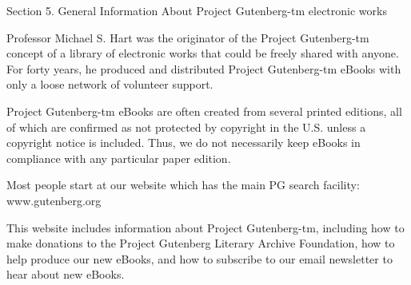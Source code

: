 Section 5. General Information About Project Gutenberg-tm electronic works

Professor Michael S. Hart was the originator of the Project
Gutenberg-tm concept of a library of electronic works that could be
freely shared with anyone. For forty years, he produced and
distributed Project Gutenberg-tm eBooks with only a loose network of
volunteer support.

Project Gutenberg-tm eBooks are often created from several printed
editions, all of which are confirmed as not protected by copyright in
the U.S. unless a copyright notice is included. Thus, we do not
necessarily keep eBooks in compliance with any particular paper
edition.

Most people start at our website which has the main PG search
facility: www.gutenberg.org

This website includes information about Project Gutenberg-tm,
including how to make donations to the Project Gutenberg Literary
Archive Foundation, how to help produce our new eBooks, and how to
subscribe to our email newsletter to hear about new eBooks.


